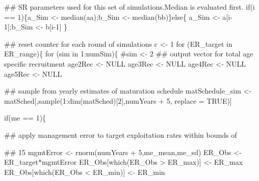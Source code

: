 \documentclass[
  11pt,
]{article}
\newenvironment{Shaded}{}{}
\newcommand{\CommentTok}[1]{\textcolor[rgb]{0.00,0.50,0.00}{#1}}
\newcommand{\ControlFlowTok}[1]{\textcolor[rgb]{0.00,0.00,1.00}{#1}}
\newcommand{\DataTypeTok}[1]{#1}
\newcommand{\DecValTok}[1]{#1}
\newcommand{\KeywordTok}[1]{\textcolor[rgb]{0.00,0.00,1.00}{#1}}
\newcommand{\NormalTok}[1]{#1}
\newcommand{\OperatorTok}[1]{#1}
\newcommand{\OtherTok}[1]{\textcolor[rgb]{1.00,0.25,0.00}{#1}}
\newcommand{\StringTok}[1]{\textcolor[rgb]{0.00,0.50,0.50}{#1}}
\begin{document}
\begin{Shaded}
\begin{Highlighting}[]
    \CommentTok{## SR parameters used for this set of simulations.Median is evaluated first.}
    \ControlFlowTok{if}\NormalTok{(i }\OperatorTok{==}\StringTok{ }\DecValTok{1}\NormalTok{)\{a_Sim <-}\StringTok{ }\KeywordTok{median}\NormalTok{(aa);b_Sim <-}\StringTok{ }\KeywordTok{median}\NormalTok{(bb)\}}\ControlFlowTok{else}\NormalTok{\{}
\NormalTok{      a_Sim <-}\StringTok{ }\NormalTok{a[i}\DecValTok{-1}\NormalTok{];b_Sim <-}\StringTok{ }\NormalTok{b[i}\DecValTok{-1}\NormalTok{]}
\NormalTok{    \}}
    
    \CommentTok{## reset counter for each round of simulations}
\NormalTok{    c <-}\StringTok{ }\DecValTok{1}
    \ControlFlowTok{for}\NormalTok{ (ER_target }\ControlFlowTok{in}\NormalTok{ ER_range)\{}
      \ControlFlowTok{for}\NormalTok{ (sim }\ControlFlowTok{in} \DecValTok{1}\OperatorTok{:}\NormalTok{numSim)\{}
        \CommentTok{#sim <- 2}
        \CommentTok{## output vector for total age specific recruitment}
\NormalTok{        age2Rec <-}\StringTok{ }\OtherTok{NULL}
\NormalTok{        age3Rec <-}\StringTok{ }\OtherTok{NULL}
\NormalTok{        age4Rec <-}\StringTok{ }\OtherTok{NULL}
\NormalTok{        age5Rec <-}\StringTok{ }\OtherTok{NULL}
        
        \CommentTok{## sample from yearly estimates of maturation schedule}
\NormalTok{        matSchedule_sim <-}\StringTok{ }\NormalTok{matSched[,}\KeywordTok{sample}\NormalTok{(}\DecValTok{1}\OperatorTok{:}\KeywordTok{dim}\NormalTok{(matSched)[}\DecValTok{2}\NormalTok{],numYears }\OperatorTok{+}\StringTok{ }\DecValTok{5}\NormalTok{, }\DataTypeTok{replace =} \OtherTok{TRUE}\NormalTok{)]}
        
        \ControlFlowTok{if}\NormalTok{(me }\OperatorTok{==}\StringTok{ }\DecValTok{1}\NormalTok{)\{}
          
          \CommentTok{## apply management error to target exploitation rates within bounds of}
          \CommentTok{## 15%
\NormalTok{          mgmtError <-}\StringTok{ }\KeywordTok{rnorm}\NormalTok{(numYears }\OperatorTok{+}\StringTok{ }\DecValTok{5}\NormalTok{,me_mean,me_sd)}
\NormalTok{          ER_Obs <-}\StringTok{ }\NormalTok{ER_target}\OperatorTok{*}\NormalTok{mgmtError}
\NormalTok{          ER_Obs[}\KeywordTok{which}\NormalTok{(ER_Obs }\OperatorTok{>}\StringTok{ }\NormalTok{ER_max)] <-}\StringTok{ }\NormalTok{ER_max}
\NormalTok{          ER_Obs[}\KeywordTok{which}\NormalTok{(ER_Obs }\OperatorTok{<}\StringTok{ }\NormalTok{ER_min)] <-}\StringTok{ }\NormalTok{ER_min}
            
}
\end{Highlighting}
\end{Shaded}
\end{document}
